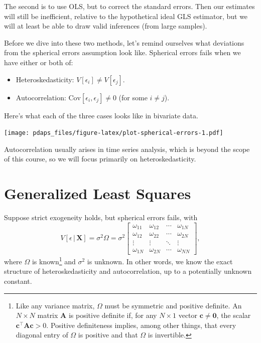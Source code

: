 \documentclass[12pt,oneside,openany]{book}
\let\rmarkdownfootnote\footnote%
\def\footnote{\protect\rmarkdownfootnote}
\begin{document}
The second is to use OLS, but to correct the standard errors. Then our
estimates will still be inefficient, relative to the hypothetical ideal
GLS estimator, but we will at least be able to draw valid inferences
(from large samples).

Before we dive into these two methods, let's remind ourselves what
deviations from the spherical errors assumption look like. Spherical
errors fails when we have either or both of:

\begin{itemize}
\item
  Heteroskedasticity: \(V[\epsilon_i] \neq V[\epsilon_j]\).
\item
  Autocorrelation: \(\text{Cov}[\epsilon_i, \epsilon_j] \neq 0\) (for
  some \(i \neq j\)).
\end{itemize}

Here's what each of the three cases looks like in bivariate data.

\texttt{[image: pdaps\_files/figure-latex/plot-spherical-errors-1.pdf]}

Autocorrelation usually arises in time series analysis, which is beyond
the scope of this course, so we will focus primarily on
heteroskedasticity.

\section{Generalized Least Squares}\label{generalized-least-squares}

Suppose strict exogeneity holds, but spherical errors fails, with \[
V[\epsilon \,|\, \mathbf{X}]
= \sigma^2 \Omega
= \sigma^2 \begin{bmatrix}
  \omega_{11} & \omega_{12} & \cdots & \omega_{1N} \\
  \omega_{12} & \omega_{22} & \cdots & \omega_{2N} \\
  \vdots & \vdots & \ddots & \vdots \\
  \omega_{1N} & \omega_{2N} & \cdots & \omega_{NN}
\end{bmatrix},
\] where \(\Omega\) is known\footnote{Like any variance matrix,
  \(\Omega\) must be symmetric and positive definite. An \(N \times N\)
  matrix \(\mathbf{A}\) is positive definite if, for any \(N \times 1\)
  vector \(\mathbf{c} \neq \mathbf{0}\), the scalar
  \(\mathbf{c}^\top \mathbf{A} \mathbf{c} > 0\). Positive definiteness
  implies, among other things, that every diagonal entry of \(\Omega\)
  is positive and that \(\Omega\) is invertible.} and \(\sigma^2\) is
unknown. In other words, we know the exact structure of
heteroskedasticity and autocorrelation, up to a potentially unknown
constant.
\end{document}
